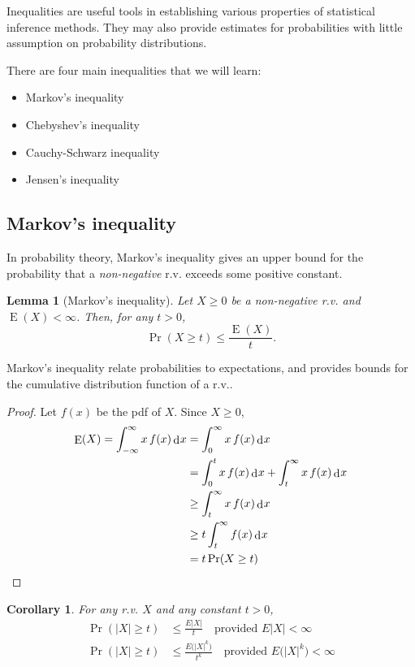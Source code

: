 \documentclass[
]{book}
\providecommand{\tightlist}{%
  \setlength{\itemsep}{0pt}\setlength{\parskip}{0pt}}
\DeclareMathOperator{\E}{E}
\DeclareMathOperator{\dd}{d}
\newcommand{\dint}{\dd\hspace{0.5pt}\!}
\newtheorem{lemma}{Lemma}[chapter]
\newtheorem{corollary}{Corollary}[chapter]
\theoremstyle{definition}
\theoremstyle{definition}
\theoremstyle{definition}
\theoremstyle{definition}
\theoremstyle{remark}
\begin{document}
Inequalities are useful tools in establishing various properties of statistical inference methods.
They may also provide estimates for probabilities with little assumption on probability distributions.

There are four main inequalities that we will learn:

\begin{itemize}
\tightlist
\item
  Markov's inequality
\item
  Chebyshev's inequality
\item
  Cauchy-Schwarz inequality
\item
  Jensen's inequality
\end{itemize}

\hypertarget{markovs-inequality}{%
\subsection{Markov's inequality}\label{markovs-inequality}}

In probability theory, Markov's inequality gives an upper bound for the
probability that a \emph{non-negative} r.v. exceeds some positive constant.

\begin{lemma}[Markov's inequality]
Let \(X\geq 0\) be a non-negative r.v. and \(\E(X) < \infty\). Then, for any
\(t>0\), \[\Pr(X\geq t) \leq \frac{\E(X)}{t}.\]
\end{lemma}

Markov's inequality relate probabilities to expectations, and provides
bounds for the cumulative distribution function of a r.v..

\begin{proof}
Let \(f(x)\) be the pdf of \(X\). Since \(X\geq 0\), \[\begin{aligned}
    \E(X) = \int_{-\infty}^{\infty} x\,f(x) \dint x &= \int_0^{\infty} x\,f(x) \dint x \\
    &= \int_0^t x\,f(x) \dint x + \int_t^\infty x\,f(x) \dint x \\
    &\geq \int_t^\infty x\,f(x) \dint x \\
    &\geq t\int_t^\infty f(x) \dint x \\
    &= t\Pr(X\geq t) 
  \end{aligned}\]
\end{proof}

\begin{corollary}
For any r.v. \(X\) and any constant \(t>0\), \[\begin{aligned}
      \Pr(|X|\geq t) &\leq \frac{E|X|}{t} \ \ \ \text{ provided } E|X|<\infty \\
      \Pr(|X|\geq t) &\leq \frac{E\big(|X|^k\big)}{t^k} \ \ \ \text{ provided } E\big(|X|^k\big)<\infty
    \end{aligned}\]
\end{corollary}
\end{document}
